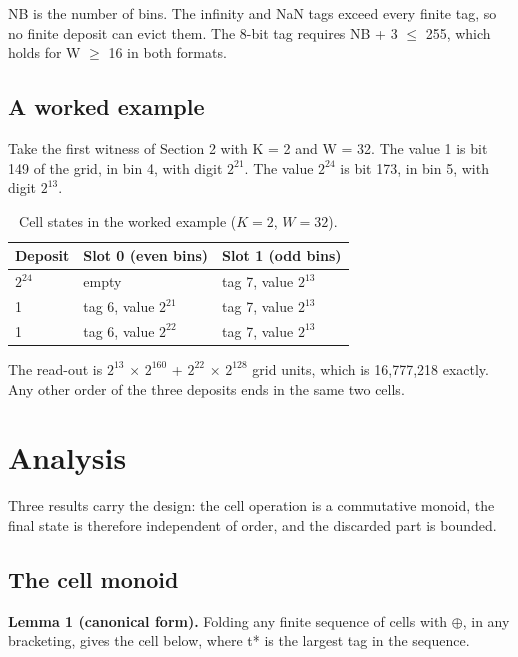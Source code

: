 \documentclass[journal]{IEEEtran}
\begin{document}
NB is the number of bins. The infinity and NaN tags exceed every finite
tag, so no finite deposit can evict them. The 8-bit tag requires NB + 3
$\leq$ 255, which holds for W $\geq$ 16 in both formats.

\hypertarget{a-worked-example}{%
\subsection{A worked example}\label{a-worked-example}}

Take the first witness of Section 2 with K = 2 and W = 32. The value 1
is bit 149 of the grid, in bin 4, with digit \(2^{21}\). The value
\(2^{24}\) is bit 173, in bin 5, with digit \(2^{13}\).

\begin{table}[!htbp]\centering\small
\caption{Cell states in the worked example ($K=2$, $W=32$).}\label{tab:5}
\begin{tabular}{lll}
\toprule
Deposit & Slot 0 (even bins) & Slot 1 (odd bins) \\
\midrule
\(2^{24}\) & empty & tag 7, value \(2^{13}\) \\
1 & tag 6, value \(2^{21}\) & tag 7, value \(2^{13}\) \\
1 & tag 6, value \(2^{22}\) & tag 7, value \(2^{13}\) \\
\bottomrule
\end{tabular}
\end{table}

The read-out is \(2^{13}\) × \(2^{160}\) + \(2^{22}\) × \(2^{128}\) grid
units, which is 16,777,218 exactly. Any other order of the three
deposits ends in the same two cells.

\hypertarget{analysis}{%
\section{Analysis}\label{analysis}}

Three results carry the design: the cell operation is a commutative
monoid, the final state is therefore independent of order, and the
discarded part is bounded.

\hypertarget{the-cell-monoid}{%
\subsection{The cell monoid}\label{the-cell-monoid}}

\textbf{Lemma 1 (canonical form).} Folding any finite sequence of cells
with $\oplus$, in any bracketing, gives the cell below, where t* is the largest
tag in the sequence.
\end{document}
